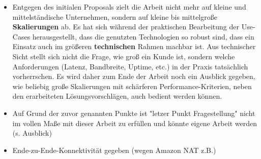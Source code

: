 \begin{itemize}
\item Entgegen des initialen Proposals zielt die Arbeit nicht mehr auf kleine und mittelständische Unternehmen, sondern auf kleine bis mittelgroße \textbf{Skalierungen} ab. Es hat sich während der praktischen Bearbeitung der Use-Cases herausgestellt, dass die genutzten Technologien so robust sind, dass ein Einsatz auch im \glqq größeren \textbf{technischen} Rahmen\grqq{} machbar ist. Aus technischer Sicht stellt sich nicht die Frage, wie \glqq groß\grqq{} ein Kunde ist, sondern welche Anforderungen (Latenz, Bandbreite, Uptime, etc.) in der Praxis tatsächlich vorherrschen. Es wird daher zum Ende der Arbeit noch ein Ausblick gegeben, wie beliebig große Skalierungen mit schärferen Performance-Kriterien, neben den erarbeiteten Lösungsvorschlägen, auch bedient werden können.
\item Auf Grund der zuvor genannten Punkte ist "letzer Punkt Fragestellung" nicht im vollen Maße mit dieser Arbeit zu erfüllen und könnte eigene Arbeit werden (s. Ausblick)
\item Ende-zu-Ende-Konnektivität gegeben (wegen Amazon NAT z.B.)


\end{itemize}

\iffalse
Serifen Schrit für Programmnamen?
Teilweise gekürzt mit [...] oder Funktionsnamen der Einfachheit umbenannt oder vereinfacht dargestellt
RFC-Doku-Addressen
Getestet mit Terraform Version...
Abkürzungen AWS, VPC werden einmal erläutert, danach Schicht im Schacht
Rein technischer Natur, es wird nicht auf Kostenoptimierung eingangen -> dafür ist Cloud-Costs zu komplex
Abgrenzung: alle Public-IP und Private-IP beziehen sich auf IPv3!!!
Kommandos sind mit Dollar markiert. Sie werden genutzt, wenn ein Filterausdruck erkennbar sein soll, oftmals mit grep
Typische Schalter in dieser Arbeit:
-A n: Zeige auch die nächsten n Zeilen nach einem Treffer
-B n: Zeige auch die vorherigen n Zeilen vor einem Treffer
-o Zeige ausschließlich den Treffer, nicht die komplette Zeile, oftmals im Zusammenspiel mit -E
-E Suche mit Hilfe von regulären Ausdrücken (Regex)
-v ignoriere Zeilen, die das Pattern beinhalten (invertiere)
Linux-Grundlagen werden vorausgesetzt, iptables, cat, head, tail, 
Alle Zeichnungen wurden draw.io gemacht. Auch die Shapes entstammen draw.io
Monospace für Programmaufrufe
Unterstrichen für Dateinamen
Alle Codebeispiele finden sich im Github
\fi